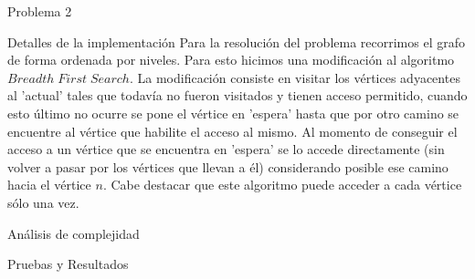 \begin{section}{Problema 2}
\begin{subsection}{Detalles de la implementación}
		Para la resolución del problema recorrimos el grafo de forma ordenada por niveles. Para esto hicimos una modificación al algoritmo $Breadth\; First\; Search$. La modificación consiste en visitar los vértices adyacentes al 'actual' tales que todavía no fueron visitados y tienen acceso permitido, cuando esto último no ocurre se pone el vértice en 'espera' hasta que por otro camino se encuentre al vértice que habilite el acceso al mismo. Al momento de conseguir el acceso a un vértice que se encuentra en 'espera' se lo accede directamente (sin volver a pasar por los vértices que llevan a él) considerando posible ese camino hacia el vértice $n$. Cabe destacar que este algoritmo puede acceder a cada vértice sólo una vez.\\ 
	\end{subsection}


	\begin{subsection}{Análisis de complejidad}
		
	\end{subsection}


	\begin{subsection}{Pruebas y Resultados}

	\end{subsection}

\end{section}

